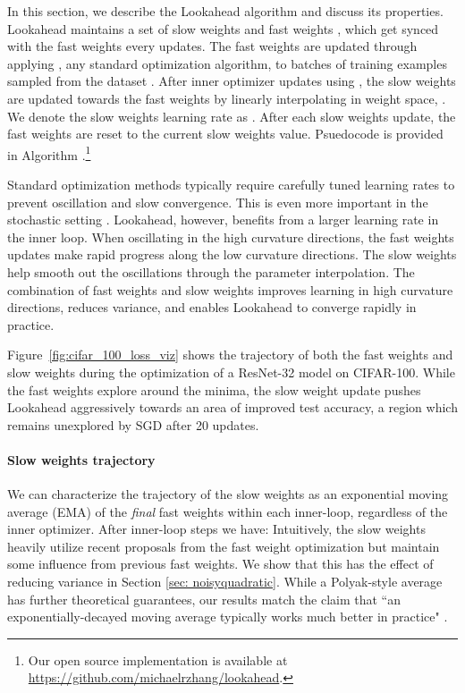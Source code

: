 \documentclass{article}
\begin{document}
In this section, we describe the Lookahead algorithm and discuss its properties. Lookahead maintains a set of slow weights  and fast weights , which get synced with the fast weights every  updates. The fast weights are updated through applying , any standard optimization algorithm, to batches of training examples sampled from the dataset . After  inner optimizer updates using , the slow weights are updated towards the fast weights by linearly interpolating in weight space, . We denote the slow weights learning rate as . After each slow weights update, the fast weights are reset to the current slow weights value. Psuedocode is provided in Algorithm .\footnote{Our open source implementation is available at \url{https://github.com/michaelrzhang/lookahead}.}

Standard optimization methods typically require carefully tuned learning rates to prevent oscillation and slow convergence. This is even more important in the stochastic setting \citep{martens2014new, wu2018understanding}. Lookahead, however, benefits from a larger learning rate in the inner loop. When oscillating in the high curvature directions, the fast weights updates make rapid progress along the low curvature directions. The slow weights help smooth out the oscillations through the parameter interpolation. The combination of fast weights and slow weights improves learning in high curvature directions, reduces variance, and enables Lookahead to converge rapidly in practice.  

Figure~\ref{fig:cifar_100_loss_viz} shows the trajectory of both the fast weights and slow weights during the optimization of a ResNet-32 model on CIFAR-100. While the fast weights explore around the minima, the slow weight update pushes Lookahead aggressively towards an area of improved test accuracy, a region which remains unexplored by SGD after 20 updates. 

\paragraph{Slow weights trajectory} We can characterize the trajectory of the slow weights as an exponential moving average (EMA) of the \emph{final} fast weights within each inner-loop, regardless of the inner optimizer. {After  inner-loop steps we have: }
Intuitively, the slow weights heavily utilize recent proposals from the fast weight optimization but maintain some influence from previous fast weights. We show that this has the effect of reducing variance in Section \ref{sec: noisyquadratic}. While a Polyak-style average has further theoretical guarantees, our results match the claim that ``an exponentially-decayed moving average typically works much better in practice" \citep{martens2014new}.
\end{document}
